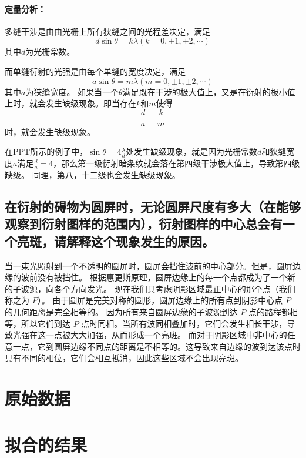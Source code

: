 \documentclass[]{../../templates/Report}%
\begin{document}
\begin{fullreportonly}
\paragraph{定量分析：}
多缝干涉是由由光栅上所有狭缝之间的光程差决定，满足\[
d\sin\theta = k\lambda (k = 0, \pm 1, \pm 2, \cdots)
\]
其中$d$为光栅常数。

而单缝衍射的光强是由每个单缝的宽度决定，满足\[
a\sin\theta = m\lambda (m = 0, \pm 1, \pm 2, \cdots)
\]
其中$a$为狭缝宽度。
如果当一个$\theta$满足既在干涉的极大值上，又是在衍射的极小值上时，就会发生缺级现象。即当存在$k$和$m$使得
\[
\frac{d}{a} = \frac{k}{m}
\]
时，就会发生缺级现象。

在PPT所示的例子中，$\sin\theta = 4\frac{\lambda}{d}$处发生缺级现象，就是因为光栅常数$d$和狭缝宽度$a$满足$\frac{d}{a} = 4$，那么第一级衍射暗条纹就会落在第四级干涉极大值上，导致第四级缺级。
同理，第八，十二级也会发生缺级现象。
\subsection{在衍射的碍物为圆屏时，无论圆屏尺度有多大（在能够观察到衍射图样的范围内），衍射图样的中心总会有一个亮斑，请解释这个现象发生的原因。}
当一束光照射到一个不透明的圆屏时，圆屏会挡住波前的中心部分。但是，圆屏边缘的波前没有被挡住。
根据惠更斯原理，圆屏边缘上的每一个点都成为了一个新的子波源，向各个方向发光。
现在我们只考虑阴影区域最正中心的那个点（我们称之为 $P$）。
由于圆屏是完美对称的圆形，圆屏边缘上的所有点到阴影中心点 $P$ 的几何距离是完全相等的。
因为所有来自圆屏边缘的子波源到达 $P$ 点的路程都相等，所以它们到达 $P$ 点时同相。当所有波同相叠加时，它们会发生相长干涉，导致光强在这一点被大大加强，从而形成一个亮斑。
而对于阴影区域中非中心的任意一点，它到圆屏边缘不同点的距离是不相等的。这导致来自边缘的波到达该点时具有不同的相位，它们会相互抵消，因此这些区域不会出现亮斑。
\end{fullreportonly}
\insertnotes
\begin{fullreportonly}
    \clearpage
\appendix
\section{原始数据}\label{data}
\section{拟合的结果}\label{res}

\end{fullreportonly}
\end{document}
